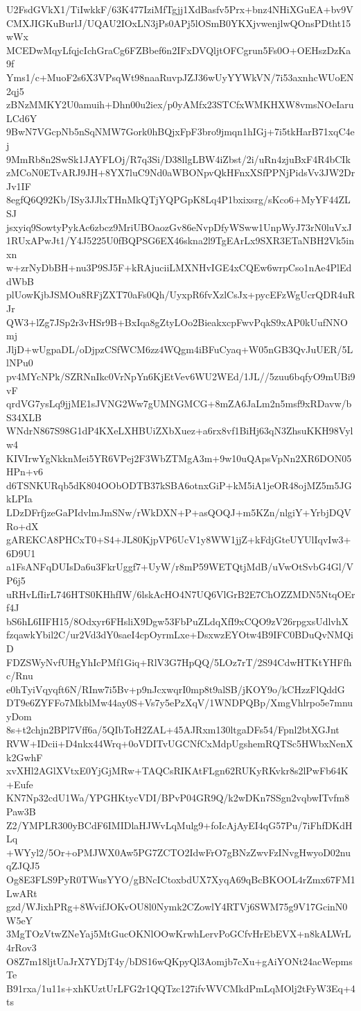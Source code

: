 U2FsdGVkX1/TiIwkkF/63K477IziMfTgjj1XdBasfv5Prx+bnz4NHiXGuEA+bv9V
CMXJIGKuBurlJ/UQAU2IOxLN3jPs0APj5lOSmB0YKXjvwenjlwQOnsPDtht15wWx
MCEDwMqyLfqjcIchGraCg6FZBbef6n2IFxDVQljtOFCgrun5Fs0O+OEHszDzKa9f
Yms1/c+MuoF2s6X3VPsqWt98naaRuvpJZJ36wUyYYWkVN/7i53axnhcWUoEN2qj5
zBNzMMKY2U0amuih+Dhn00u2iex/p0yAMfx23STCfxWMKHXW8vmsNOeIaruLCd6Y
9BwN7VGcpNb5nSqNMW7Gork0hBQjxFpF3bro9jmqn1hIGj+7i5tkHarB71xqC4ej
9MmRb8n2SwSk1JAYFLOj/R7q3Si/D38llgLBW4iZbst/2i/uRn4zjuBxF4R4bCIk
zMCoN0ETvARJ9JH+8YX7luC9Nd0aWBONpvQkHFnxXSfPPNjPidsVv3JW2DrJv1IF
8egfQ6Q92Kb/ISy3JJlxTHnMkQTjYQPGpK8Lq4P1bxixsrg/sKco6+MyYF44ZLSJ
jsxyiq9SowtyPykAc6zbcz9MriUBOaozGv86eNvpDfyWSww1UnpWyJ73rN0luVxJ
1RUxAPwJt1/Y4J5225U0fBQPSG6EX46skna2l9TgEArLx9SXR3ETaNBH2Vk5inxn
w+zrNyDbBH+nu3P9SJ5F+kRAjuciiLMXNHvIGE4xCQEw6wrpCso1nAe4PlEddWbB
plUowKjbJSMOu8RFjZXT70aFs0Qh/UyxpR6fvXzlCsJx+pycEFzWgUcrQDR4uRJr
QW3+lZg7JSp2r3vHSr9B+BxIqa8gZtyLOo2BieakxcpFwvPqkS9xAP0kUufNNOmj
JljD+wUgpaDL/oDjpzCSfWCM6zz4WQgm4iBFuCyaq+W05nGB3QvJuUER/5LlNPu0
pv4MYcNPk/SZRNnIkc0VrNpYn6KjEtVev6WU2WEd/1JL//5zuu6bqfyO9mUBi9vF
qrdVG7ysLq9jjME1sJVNG2Ww7gUMNGMCG+8mZA6JaLm2n5msf9xRDavw/bS34XLB
WNdrN867S98G1dP4KXeLXHBUiZXbXuez+a6rx8vf1BiHj63qN3ZhsuKKH98Vylw4
KIVIrwYgNkknMei5YR6VPej2F3WbZTMgA3m+9w10uQApsVpNn2XR6DON05HPn+v6
d6TSNKURqb5dK804OObODTB37kSBA6otnxGiP+kM5iA1jeOR48ojMZ5m5JGkLPIa
LDzDFrfjzeGaPIdvlmJmSNw/rWkDXN+P+asQOQJ+m5KZn/nlgiY+YrbjDQVRo+dX
gAREKCA8PHCxT0+S4+JL80KjpVP6UcV1y8WW1jjZ+kFdjGteUYUlIqvIw3+6D9U1
a1FsANFqDUIsDa6u3FkrUggf7+UyW/r8mP59WETQtjMdB/uVwOtSvbG4Gl/VP6j5
uRHvLfIirL746HTS0KHhfIW/6lskAcHO4N7UQ6VlGrB2E7ChOZZMDN5NtqOErf4J
bS6hL6IIFH15/8Odxyr6FHsliX9Dgw53FbPuZLdqXfI9xCQO9zV26rpgxsUdlvhX
fzqawkYbil2C/ur2Vd3dY0saeI4cpOyrmLxe+DsxwzEYOtw4B9IFC0BDuQvNMQiD
FDZSWyNvfUHgYhIcPMf1Giq+RlV3G7HpQQ/5LOz7rT/2S94CdwHTKtYHFfhc/Rnu
e0hTyiVqyqft6N/RInw7i5Bv+p9nJcxwqrI0mp8t9alSB/jKOY9o/kCHzzFlQddG
DT9e6ZYFFo7MkblMw44ay0S+Vs7y5ePzXqV/1WNDPQBp/XmgVhlrpo5e7mnuyDom
8s+t2chjn2BPl7Vff6a/5QIbToH2ZAL+45AJRxm130ltgaDFs54/Fpnl2btXGJnt
RVW+IDcii+D4nkx44Wrq+0oVDITvUGCNfCxMdpUgshemRQTSc5HWbxNenXk2GwhF
xvXHl2AGlXVtxE0YjGjMRw+TAQCsRIKAtFLgn62RUKyRKvkr8s2lPwFb64K+Eufe
KN7Np32cdU1Wa/YPGHKtycVDI/BPvP04GR9Q/k2wDKn7SSgn2vqbwITvfm8Paw3B
Z2/YMPLR300yBCdF6IMIDlaHJWvLqMulg9+foIcAjAyEI4qG57Pu/7iFhfDKdHLq
+WYyl2/5Or+oPMJWX0Aw5PG7ZCTO2IdwFrO7gBNzZwvFzINvgHwyoD02nuqZJQJ5
Og8E3FLS9PyR0TWusYYO/gBNcICtoxbdUX7XyqA69qBcBKOOL4rZmx67FM1LwARt
gzd/WJixhPRg+8WvifJOKvOU8l0Nymk2CZowlY4RTVj6SWM75g9V17GcinN0W5eY
3MgTOzVtwZNeYaj5MtGucOKNlOOwKrwhLervPoGCfvHrEbEVX+n8kALWrL4rRov3
O8Z7m18ljtUaJrX7YDjT4y/bDS16wQKpyQl3Aomjb7cXu+gAiYONt24acWepmsTe
B91rxa/1u11s+xhKUztUrLFG2r1QQTzc127ifvWVCMkdPmLqMOlj2tFyW3Eq+4ts
